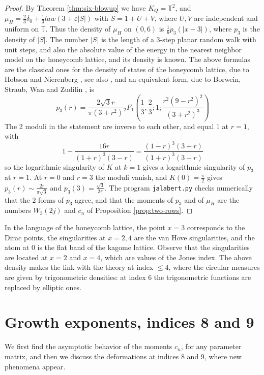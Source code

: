\documentclass[11pt,reqno]{amsart}
\theoremstyle{definition}
\numberwithin{equation}{section}
\begin{document}
\begin{proof}
By Theorem \ref{thm:six-blowup} we have $K_Q=\mathbb T^2$, and $\mu_H=\frac23\delta_0+\frac13 law(3+\varepsilon|S|)$ with $S=1+U+V$, where $U,V$ are independent and uniform on $\mathbb T$. Thus the density of $\mu_H$ on $(0,6)$ is $\frac16p_3(|x-3|)$, where $p_3$ is the density of $|S|$. The number $|S|$ is the length of a 3-step planar random walk with unit steps, and also the absolute value of the energy in the nearest neighbor model on the honeycomb lattice, and its density is known. The above formulas are the classical ones for the density of states of the honeycomb lattice, due to Hobson and Nierenberg \cite{HN53}, see also \cite{CGPNG09}, and an equivalent form, due to Borwein, Straub, Wan and Zudilin \cite{BSWZ12}, is
$$p_3(r)=\frac{2\sqrt3r}{\pi(3+r^2)}{}_2F_1\left(\frac13,\frac23;1;\frac{r^2(9-r^2)^2}{(3+r^2)^3}\right)$$
The 2 moduli in the statement are inverse to each other, and equal 1 at $r=1$, with
$$1-\frac{16r}{(1+r)^3(3-r)}=\frac{(1-r)^3(3+r)}{(1+r)^3(3-r)}$$
so the logarithmic singularity of $K$ at $k=1$ gives a logarithmic singularity of $p_3$ at $r=1$. At $r=0$ and $r=3$ the moduli vanish, and $K(0)=\frac\pi2$ gives $p_3(r)\sim\frac{2r}{\pi\sqrt3}$ and $p_3(3)=\frac{\sqrt3}{2\pi}$. The program \texttt{jalabert.py} checks numerically that the 2 forms of $p_3$ agree, and that the moments of $p_3$ and of $\mu_H$ are the numbers $W_3(2j)$ and $c_n$ of Proposition \ref{prop:two-rows}.
\end{proof}

In the language of the honeycomb lattice, the point $x=3$ corresponds to the Dirac points, the singularities at $x=2,4$ are the van Hove singularities, and the atom at $0$ is the flat band of the kagome lattice. Observe that the singularities are located at $x=2$ and $x=4$, which are values of the Jones index. The above density makes the link with the theory at index $\leq4$, where the circular measures are given by trigonometric densities: at index 6 the trigonometric functions are replaced by elliptic ones.

\section{Growth exponents, indices 8 and 9}\label{sec:growth}

We first find the asymptotic behavior of the moments $c_n$, for any parameter matrix, and then we discuss the deformations at indices 8 and 9, where new phenomena appear.
\end{document}
